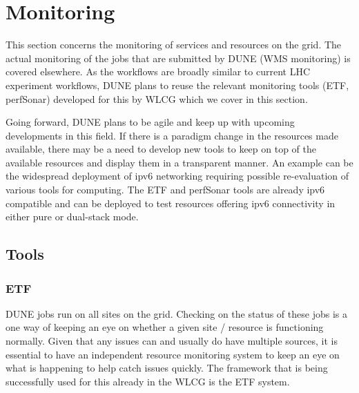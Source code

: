 \chapter{Monitoring }
\label{ch:mon}

\FPadd\MonEtfTotalPeople\MonEtfOpsPeople\MonEtfDevPeople %

This section concerns the monitoring of services and resources on the grid. The actual monitoring of the jobs that are submitted by DUNE (WMS monitoring) is covered elsewhere. As the workflows are broadly similar to current LHC experiment workflows, DUNE plans to reuse the relevant monitoring tools (ETF, perfSonar) developed for this by WLCG which we cover in this section.

Going forward, DUNE plans to be agile and keep up with upcoming developments in this field. If there is a paradigm change in the resources made available, there may be a need to develop new tools to keep on top of the available resources and display them in a transparent manner. An example can be the widespread deployment of ipv6\cite{bib:ipv6TaskForce} networking requiring possible re-evaluation of various tools for computing. The ETF and perfSonar tools are already ipv6 compatible and can be deployed to test resources offering ipv6 connectivity in either pure or dual-stack mode.

\section{Tools}
\label{sec:mon:xyz}  %
\subsection{ETF}

DUNE jobs run on all sites on the grid. Checking on the status of these jobs is a one way of keeping an eye on whether a given site / resource is functioning normally. Given that any issues can and usually do have multiple sources, it is essential to have an independent resource monitoring system to keep an eye on what is happening to help catch issues quickly. The framework that is being successfully used for this already in the WLCG is the ETF system.

